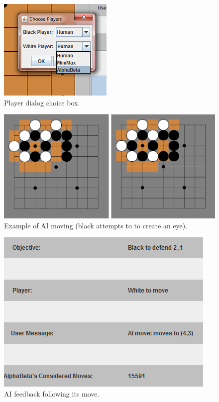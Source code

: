 \documentclass{l3proj}
\begin{document}
\begin{figure}[H]
\centering
\includegraphics[scale=1]{Images/GUI-8-PlayerChoice.png}
\caption{Player dialog choice box.}
\label{PlayerRef}
\end{figure}

\begin{figure}[H]
\centering
\includegraphics[scale=0.5]{Images/GUI-9-AIMove1.png}
\caption{Example of AI moving (black attempts to to create an eye).}
\label{AIGUIMove1}
\end{figure}

\begin{figure}[H]
\centering
\includegraphics[scale=1]{Images/GUI-11-AIMove3Feedback.png}
\caption{AI feedback following its move.}
\label{AIGUIMoveFeedback}
\end{figure}
\end{document}
